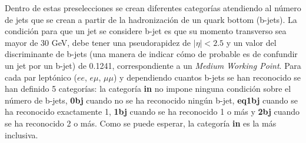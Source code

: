 Dentro de estas preselecciones se crean diferentes categorías atendiendo al número de jets que se crean a partir de la hadronización de un quark bottom (b-jets). La condición para que un jet se considere b-jet es que su momento transverso sea mayor de 30 GeV, debe tener una pseudorapidez de $|\eta| < 2.5$ y un valor del discriminante de b-jets (una manera de indicar cómo de probable es de confundir un jet por un b-jet) de 0.1241, correspondiente a un \textit{Medium Working Point}. \cite{LooseWorkingPoint} Para cada par leptónico ($ee$, $e\mu$,  $\mu\mu$) y dependiendo cuantos b-jets se han reconocido se han definido 5 categorías: la categoría \textbf{in} no impone ninguna condición sobre el número de b-jets, \textbf{0bj} cuando no se ha reconocido ningún b-jet, \textbf{eq1bj} cuando se ha reconocido exactamente 1, \textbf{1bj} cuando se ha reconocido 1 o más y \textbf{2bj} cuando se ha reconocido 2 o más. Como se puede esperar, la categoría \textbf{in} es la más inclusiva. 

